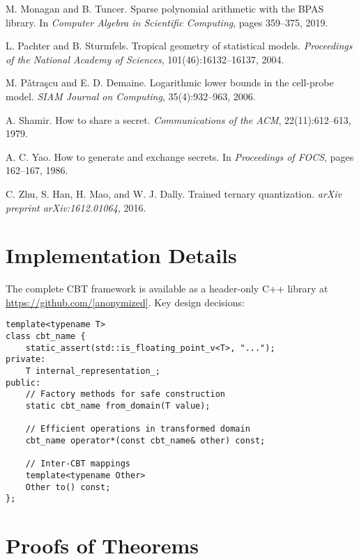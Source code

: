 \documentclass[11pt]{article}
\theoremstyle{definition}
\begin{document}
\begin{thebibliography}{99}
M. Monagan and B. Tuncer.
\newblock Sparse polynomial arithmetic with the {BPAS} library.
\newblock In \emph{Computer Algebra in Scientific Computing}, pages 359--375, 2019.

L. Pachter and B. Sturmfels.
\newblock Tropical geometry of statistical models.
\newblock \emph{Proceedings of the National Academy of Sciences}, 101(46):16132--16137, 2004.

M. P\v{a}tra\c{s}cu and E. D. Demaine.
\newblock Logarithmic lower bounds in the cell-probe model.
\newblock \emph{SIAM Journal on Computing}, 35(4):932--963, 2006.

A. Shamir.
\newblock How to share a secret.
\newblock \emph{Communications of the ACM}, 22(11):612--613, 1979.

A. C. Yao.
\newblock How to generate and exchange secrets.
\newblock In \emph{Proceedings of FOCS}, pages 162--167, 1986.

C. Zhu, S. Han, H. Mao, and W. J. Dally.
\newblock Trained ternary quantization.
\newblock \emph{arXiv preprint arXiv:1612.01064}, 2016.

\end{thebibliography}

\appendix

\section{Implementation Details}

The complete CBT framework is available as a header-only C++ library at \url{https://github.com/[anonymized]}. Key design decisions:

\begin{lstlisting}[caption={CBT design pattern}]
template<typename T>
class cbt_name {
    static_assert(std::is_floating_point_v<T>, "...");
private:
    T internal_representation_;
public:
    // Factory methods for safe construction
    static cbt_name from_domain(T value);
    
    // Efficient operations in transformed domain
    cbt_name operator*(const cbt_name& other) const;
    
    // Inter-CBT mappings
    template<typename Other>
    Other to() const;
};
\end{lstlisting}

\section{Proofs of Theorems}
\end{document}
